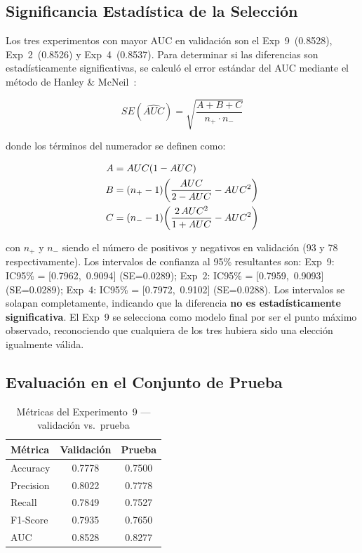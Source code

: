 \documentclass[conference]{IEEEtran}
\begin{document}
\subsection{Significancia Estad\'{i}stica de la Selecci\'{o}n}

Los tres experimentos con mayor AUC en validaci\'{o}n son el Exp~9~(0.8528), Exp~2~(0.8526) y Exp~4~(0.8537). Para determinar si las diferencias son estad\'{i}sticamente significativas, se calcul\'{o} el error est\'{a}ndar del AUC mediante el m\'{e}todo de Hanley \& McNeil~\cite{hanley1982}:

\begin{equation}
  SE(\widehat{AUC}) = \sqrt{\frac{A + B + C}{n_+ \cdot n_-}}
\end{equation}

donde los t\'{e}rminos del numerador se definen como:

\begin{align}
  A &= AUC(1-AUC) \notag \\
  B &= (n_+ - 1)\!\left(\frac{AUC}{2-AUC} - AUC^2\right) \notag \\
  C &= (n_- - 1)\!\left(\frac{2\,AUC^2}{1+AUC} - AUC^2\right) \notag
\end{align}

con $n_+$ y $n_-$ siendo el n\'{u}mero de positivos y negativos en validaci\'{o}n (93 y 78 respectivamente). Los intervalos de confianza al 95\% resultantes son: Exp~9: IC95\% = [0.7962,~0.9094] (SE=0.0289); Exp~2: IC95\% = [0.7959,~0.9093] (SE=0.0289); Exp~4: IC95\% = [0.7972,~0.9102] (SE=0.0288). Los intervalos se solapan completamente, indicando que la diferencia \textbf{no es estad\'{i}sticamente significativa}. El Exp~9 se selecciona como modelo final por ser el punto m\'{a}ximo observado, reconociendo que cualquiera de los tres hubiera sido una elecci\'{o}n igualmente v\'{a}lida.

\subsection{Evaluaci\'{o}n en el Conjunto de Prueba}

\begin{table}[H]
\caption{M\'{e}tricas del Experimento~9 --- validaci\'{o}n vs.\ prueba}
\label{tab:final}
\centering
\begin{tabular}{lcc}
\toprule
\textbf{M\'{e}trica} & \textbf{Validaci\'{o}n} & \textbf{Prueba} \\
\midrule
Accuracy  & 0.7778 & 0.7500 \\
Precision & 0.8022 & 0.7778 \\
Recall    & 0.7849 & 0.7527 \\
F1-Score  & 0.7935 & 0.7650 \\
AUC       & 0.8528 & 0.8277 \\
\bottomrule
\end{tabular}
\end{table}
\end{document}
